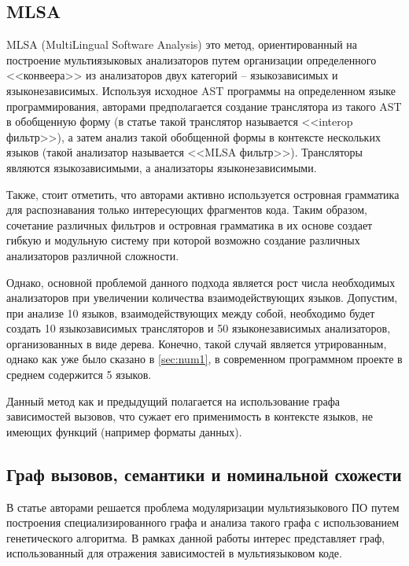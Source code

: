 \subsection{MLSA} \label{ssec:mlsa}

MLSA (MultiLingual Software Analysis) \cite{MLSA} это метод, ориентированный на построение мультиязыковых анализаторов
путем организации определенного <<конвеера>> из анализаторов двух категорий -- языкозависимых и языконезависимых.
Используя исходное AST программы на определенном языке программирования, авторами предполагается
создание транслятора из такого AST в обобщенную форму (в статье такой транслятор называется <<interop фильтр>>),
а затем анализ такой обобщенной формы в контексте нескольких языков (такой анализатор называется <<MLSA фильтр>>).
Трансляторы являются языкозависимыми, а анализаторы языконезависимыми.

Также, стоит отметить, что авторами активно используется островная грамматика \cite{island-grammars} для
распознавания только интересующих фрагментов кода. Таким образом, сочетание различных фильтров и островная грамматика
в их основе создает гибкую и модульную систему при которой возможно создание различных анализаторов различной сложности.

Однако, основной проблемой данного подхода является рост числа необходимых анализаторов при увеличении
количества взаимодействующих языков. Допустим, при анализе 10 языков, взаимодействующих между собой, необходимо
будет создать 10 языкозависимых трансляторов и 50 языконезависимых анализаторов, организованных в виде
дерева. Конечно, такой случай является утрированным, однако как уже было сказано в \ref{sec:num1}, в современном
программном проекте в среднем содержится 5 языков.

Данный метод как и предыдущий полагается на использование графа зависимостей вызовов, что сужает его применимость
в контексте языков, не имеющих функций (например форматы данных).

\subsection{Граф вызовов, семантики и номинальной схожести} \label{ssec:graphs}

В статье \cite{SNDGA} авторами решается проблема модуляризации мультиязыкового ПО путем построения специализированного графа
и анализа такого графа с использованием генетического алгоритма. В рамках данной работы интерес представляет
граф, использованный для отражения зависимостей в мультиязыковом коде.

